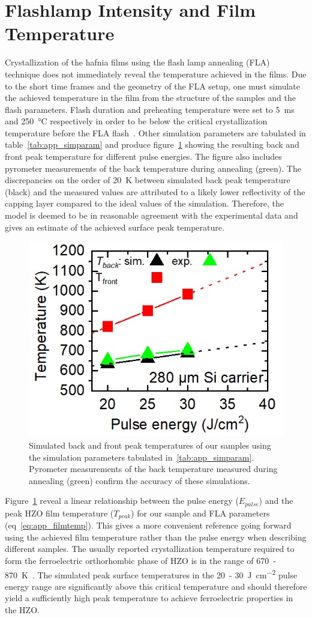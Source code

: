 \documentclass[11pt,twoside]{eitExjobb}
\begin{document}
\section{Flashlamp Intensity and Film Temperature}
Crystallization of the hafnia films using the flash lamp annealing (FLA)
technique does not immediately reveal the temperature achieved in the films. Due
to the short time frames and the geometry of the FLA setup, one must simulate
the achieved temperature in the film from the structure of the samples and the
flash parameters. Flash duration and preheating temperature were set to
\SI{5}{\milli\second} and \SI{250}{\celsius} respectively in order to be below
the critical crystallization temperature before the FLA
flash~\cite{migita2019phase}. Other simulation parameters are tabulated in
table~\ref{tab:app_simparam} and produce figure~\ref{fig:res_Comsol} showing the
resulting back and front peak temperature for different pulse energies. The figure also
includes pyrometer measurements of the back temperature during annealing
(green). The discrepancies on the order of \SI{20}{\kelvin} between simulated
back peak temperature (black) and the measured values are attributed to a likely
lower reflectivity of the  capping layer compared to the ideal values of
the simulation. Therefore, the model is deemed to be in reasonable agreement
with the experimental data and gives an estimate of the achieved surface peak temperature.

\begin{figure}[htbp]
    \centering
    \includegraphics[width=.41\linewidth]{fig/COMSOLFlashInt.png}
    \caption{Simulated back and front peak temperatures of our samples using the
    simulation parameters tabulated in~\ref{tab:app_simparam}. Pyrometer
    measurements of the back temperature measured during annealing (green) confirm
    the accuracy of these simulations.}\label{fig:res_Comsol}
\end{figure}

Figure~\ref{fig:res_Comsol} reveal a linear relationship between the pulse
energy ($E_{pulse}$) and the peak HZO film temperature ($T_{peak}$) for our
sample and FLA parameters (eq~\ref{eq:app_filmtemp}). This gives a more
convenient reference going forward using the achieved film temperature rather
than the pulse energy when describing different samples. The usually reported
crystallization temperature required to form the ferroelectric orthorhombic
phase of HZO is in the range of 670~-
\SI{870}{\kelvin}~\cite{muller2012ferroelectricity, athle2022improved}.
The simulated peak surface temperatures in the 20~-
\SI{30}{\joule\per\square\centi\meter} pulse energy range are significantly
above this critical temperature and should therefore yield a sufficiently high
peak temperature to achieve ferroelectric properties in the HZO.\@
\end{document}
